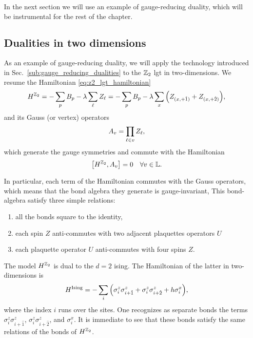 In the next section we will use an example of gauge-reducing duality, which will be instrumental for the rest of the chapter.


\subsection{Dualities in two dimensions}
\label{sub:dualities_in_two_dimensions}


As an example of gauge-reducing duality, we will apply the technology introduced in Sec.~\ref{sub:gauge_reducing_dualities} to the $\mathbb{Z}_2$ \ac{lgt} in two-dimensions.
We resume the Hamiltonian \eqref{eq:z2_lgt_hamiltonian}
\begin{equation*}
    H^{\mathbb{Z}_2}
    = - \sum_{p} B_p - \lambda \sum_{\ell} Z_{\ell}
    = - \sum_{p} B_p - \lambda \sum_{x} \qty(Z_{(x, +\hat{1})} + Z_{(x, +\hat{2})}),
\end{equation*}
and its Gauss (or vertex) operators
\begin{equation}
    A_v = \prod_{\ell \in v}  Z_{\ell},
\end{equation}
which generate the gauge symmetries and commute with the Hamiltonian
\begin{equation}
    \comm{H^{\Z_2}}{A_v} = 0 \quad \forall v \in \Lattice.
\end{equation}

In particular, each term of the Hamiltonian commutes with the Gauss operators, which means that the bond algebra they generate is gauge-invariant,
This bond-algebra satisfy three simple relations:
\begin{enumerate}[label=(\roman*)]
    \item all the bonds square to the identity,
    \item each spin $Z$ anti-commutes with two adjacent plaquettes operators $U$
    \item each plaquette operator $U$ anti-commutes with four spins $Z$.
\end{enumerate}

The model $H^{\mathbb{Z}_2}$ is dual to the $d=2$ \ac{ising}.
The Hamiltonian of the latter in two-dimensions is
\begin{equation}
    H^{\text{Ising}} =
    - \sum_{i} \qty(
        \sigma^z_i \sigma^z_{i+\hat{1}} +
        \sigma^z_i \sigma^z_{i+\hat{2}} +
        h \sigma^x_i
    ),
\end{equation}
where the index $i$ runs over the sites.
One recognizes as separate bonds the terms $\sigma^z_i \sigma^z_{i+\hat{1}}$, $\sigma^z_i \sigma^z_{i+\hat{2}}$, and $\sigma^x_i$.
It is immediate to see that these bonds satisfy the same relations of the bonds of $H^{\mathbb{Z}_2}$.

